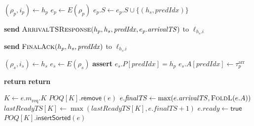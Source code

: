  \begin{algorithm}[!tb]
    \caption{Ellis\_CT Shard Leader: Request Coordination and Commit}
    \label{ellis-ct-leader-coordination}
    \begin{algorithmic}[1]
        \State $(\rho_p,i_p)\gets h_p$
        \State $e_p\gets E(\rho_p)$
        \State $e_p.S\gets
          e_p.S\cup\{(h_s,\mathit{predIdx})\}$
  
          \State \textbf{send}
            $\textsc{ArrivalTSResponse}(
              h_p,h_s,\mathit{predIdx},
              e_p.\mathit{arrivalTS})$
            to $\ell_{h_s.i}$
        \EndIf
  
          \State \textbf{send}
            $\textsc{FinalAck}(
              h_p,h_s,\mathit{predIdx})$
            to $\ell_{h_s.i}$
        \EndIf
      \EndProcedure
  
        \State $(\rho_s,i_s)\gets h_s$
        \State $e_s\gets E(\rho_s)$
        \State \textbf{assert} $e_s.P[\mathit{predIdx}]=h_p$
        \State $e_s.A[\mathit{predIdx}] \gets\tau_p^{\mathrm{arr}}$
        \State {}
      \EndProcedure

            \State \textbf{return}
        \EndIf
            \State \textbf{return}
        \EndIf

        \State $K\gets e.m_{\mathrm{req}}.K$
        \State $\mathit{POQ}[K].\mathsf{remove}(e)$
        \State $e.\mathit{finalTS}\gets
            \max(e.\mathit{arrivalTS},\Call{\foldl}{e.A})$
        \State $\mathit{lastReadyTS}[K]\gets
            \max(\mathit{lastReadyTS}[K],
                e.\mathit{finalTS}+1)$
        \State $e.\mathit{ready}\gets\mathsf{true}$
        \State $\mathit{POQ}[K].\mathsf{insertSorted}(e)$
        \State {}
      \EndProcedure


\end{algorithmic}
\end{algorithm}
